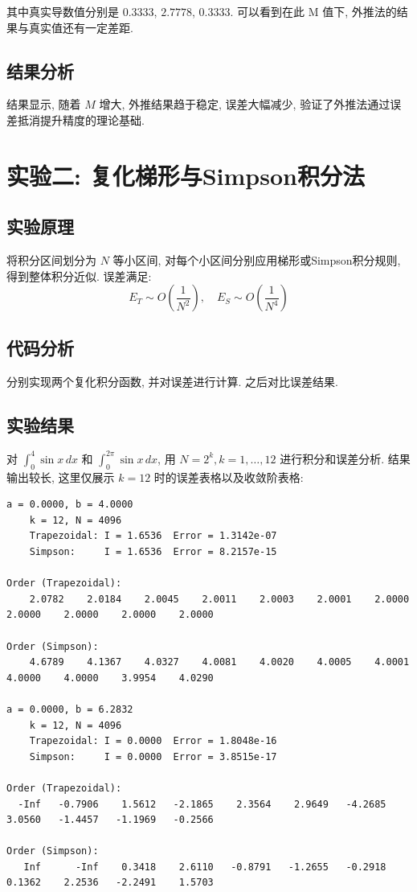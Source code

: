 \documentclass[12pt]{article}
\begin{document}
			其中真实导数值分别是 $0.3333$, $2.7778$, $0.3333$. 可以看到在此 M 值下, 外推法的结果与真实值还有一定差距.

		\subsection{结果分析}
			结果显示, 随着 $M$ 增大, 外推结果趋于稳定, 误差大幅减少, 验证了外推法通过误差抵消提升精度的理论基础.

	\section{实验二: 复化梯形与Simpson积分法}
		\subsection{实验原理}
			将积分区间划分为 $N$ 等小区间, 对每个小区间分别应用梯形或Simpson积分规则, 得到整体积分近似. 误差满足:
			\[ E_T \sim O\left(\frac{1}{N^2}\right), \quad E_S \sim O\left(\frac{1}{N^4}\right) \]

		\subsection{代码分析}
			分别实现两个复化积分函数, 并对误差进行计算. 之后对比误差结果.

		\subsection{实验结果}
			对 $\int_0^4 \sin x\,dx$ 和 $\int_0^{2\pi} \sin x\,dx$, 用 $N = 2^k, k=1,\dots,12$ 进行积分和误差分析. 结果输出较长, 这里仅展示 $k = 12$ 时的误差表格以及收敛阶表格:
\begin{lstlisting}
a = 0.0000, b = 4.0000
	k = 12, N = 4096
	Trapezoidal: I = 1.6536  Error = 1.3142e-07
	Simpson:     I = 1.6536  Error = 8.2157e-15

Order (Trapezoidal):
    2.0782    2.0184    2.0045    2.0011    2.0003    2.0001    2.0000    2.0000    2.0000    2.0000    2.0000

Order (Simpson):
    4.6789    4.1367    4.0327    4.0081    4.0020    4.0005    4.0001    4.0000    4.0000    3.9954    4.0290

a = 0.0000, b = 6.2832
	k = 12, N = 4096
	Trapezoidal: I = 0.0000  Error = 1.8048e-16
	Simpson:     I = 0.0000  Error = 3.8515e-17

Order (Trapezoidal):
  -Inf   -0.7906    1.5612   -2.1865    2.3564    2.9649   -4.2685    3.0560   -1.4457   -1.1969   -0.2566

Order (Simpson):
   Inf      -Inf    0.3418    2.6110   -0.8791   -1.2655   -0.2918    0.1362    2.2536   -2.2491    1.5703
\end{lstlisting}
\end{document}

